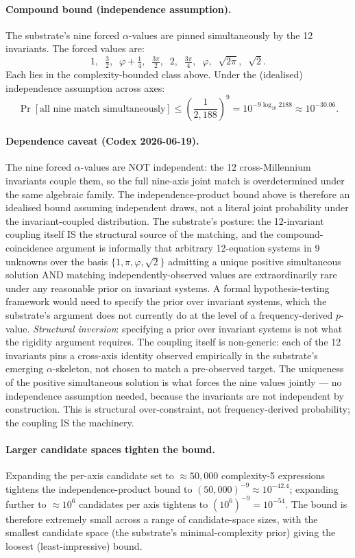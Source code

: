 \documentclass[11pt,a4paper]{amsart}
\theoremstyle{plain}
\theoremstyle{definition}
\begin{document}
\paragraph{Compound bound (independence assumption).} The substrate's nine forced $\alpha$-values are pinned simultaneously by the 12 invariants. The forced values are:
\[
1,\;\; \tfrac{3}{2},\;\; \varphi + \tfrac{1}{4},\;\; \tfrac{3\pi}{2},\;\; 2,\;\; \tfrac{3\pi}{4},\;\; \varphi,\;\; \sqrt{2\pi},\;\; \sqrt{2}.
\]
Each lies in the complexity-bounded class above. Under the (idealised) independence assumption across axes:
\[
\Pr[\text{all nine match simultaneously}] \le \left(\frac{1}{2{,}188}\right)^9 = 10^{-9 \log_{10} 2188} \approx 10^{-30.06}.
\]

\paragraph{Dependence caveat (Codex 2026-06-19).} The nine forced $\alpha$-values are NOT independent: the 12 cross-Millennium invariants couple them, so the full nine-axis joint match is overdetermined under the same algebraic family. The independence-product bound above is therefore an idealised bound assuming independent draws, not a literal joint probability under the invariant-coupled distribution. The substrate's posture: the 12-invariant coupling itself IS the structural source of the matching, and the compound-coincidence argument is informally that arbitrary 12-equation systems in 9 unknowns over the basis $\{1, \pi, \varphi, \sqrt{2}\}$ admitting a unique positive simultaneous solution AND matching independently-observed values are extraordinarily rare under any reasonable prior on invariant systems. A formal hypothesis-testing framework would need to specify the prior over invariant systems, which the substrate's argument does not currently do at the level of a frequency-derived $p$-value. \emph{Structural inversion}: specifying a prior over invariant systems is not what the rigidity argument requires. The coupling itself is non-generic: each of the 12 invariants pins a cross-axis identity observed empirically in the substrate's emerging $\alpha$-skeleton, not chosen to match a pre-observed target. The uniqueness of the positive simultaneous solution is what forces the nine values jointly --- no independence assumption needed, because the invariants are not independent by construction. This is structural over-constraint, not frequency-derived probability; the coupling IS the machinery.

\paragraph{Larger candidate spaces tighten the bound.} Expanding the per-axis candidate set to $\approx 50{,}000$ complexity-5 expressions tightens the independence-product bound to $(50{,}000)^{-9} \approx 10^{-42.4}$; expanding further to $\approx 10^6$ candidates per axis tightens to $(10^6)^{-9} = 10^{-54}$. The bound is therefore extremely small across a range of candidate-space sizes, with the smallest candidate space (the substrate's minimal-complexity prior) giving the loosest (least-impressive) bound.
\end{document}
